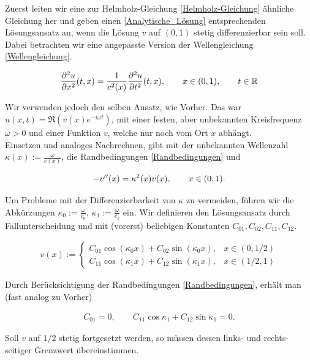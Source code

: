 Zuerst leiten wir eine zur Helmholz-Gleichung \eqref{Helmholz-Gleichung} ähnliche Gleichung her und geben einen \eqref{Analytische_Lösung} entsprechenden Lösungsansatz an, wenn die Lösung $v$ auf $(0, 1)$ stetig differenzierbar sein soll.
Dabei betrachten wir eine angepasste Version der Wellengleichung \eqref{Wellengleichung}.

\begin{align*}
  \frac{\partial^2 u}{\partial x^2} (t, x) =
  \frac{1}{c^2(x)}
  \frac{\partial^2 u}{\partial t^2} (t, x), \qquad
  x \in (0, 1), \qquad
  t \in \mathbb{R}
\end{align*}

Wir verwenden jedoch den selben Ansatz, wie Vorher. Das war $u(x, t) = \mathfrak{R} (v(x) e^{-i \omega t})$, mit einer festen, aber unbekannten Kreisfrequenz $\omega > 0$ und einer Funktion $v$, welche nur noch vom Ort $x$ abhängt. \\

Einsetzen und analoges Nachrechnen, gibt mit der unbekannten Wellenzahl $\kappa(x) := \frac{\omega}{c(x)}$, die Randbedingungen \eqref{Randbedingungen} und

\begin{align} \label{Helmholz-Gleichung}
  -v^{\prime \prime}(x) = \kappa^2(x) v(x), \qquad
  x \in (0, 1).
\end{align}

Um Probleme mit der Differenzierbarkeit von $\kappa$ zu vermeiden, führen wir die Abkürzungen $\kappa_0 := \frac{\omega}{c_0}$, $\kappa_1 := \frac{\omega}{c_1}$ ein. Wir definieren den Lösungsansatz durch Fallunterscheidung und mit (vorerst) beliebigen Konstanten $C_{01}, C_{02}, C_{11}, C_{12}$.

\begin{align*}
  v(x) :=
  \begin{cases}
    C_{01} \cos{(\kappa_0 x)} + C_{02} \sin{(\kappa_0 x)},
    & x \in (0, 1/2) \\
    C_{11} \cos{(\kappa_1 x)} + C_{12} \sin{(\kappa_1 x)},
    & x \in (1/2, 1)
  \end{cases}
\end{align*}

Durch Berücksichtigung der Randbedingungen \eqref{Randbedingungen}, erhält man (fast analog zu Vorher)

\begin{align*}
  C_{01} = 0, \qquad
  C_{11} \cos{\kappa_1} + C_{12} \sin{\kappa_1} = 0.
\end{align*}

Soll $v$ auf $1/2$ stetig fortgesetzt werden, so müssen dessen links- und rechts-seitiger Grenzwert übereinstimmen.


